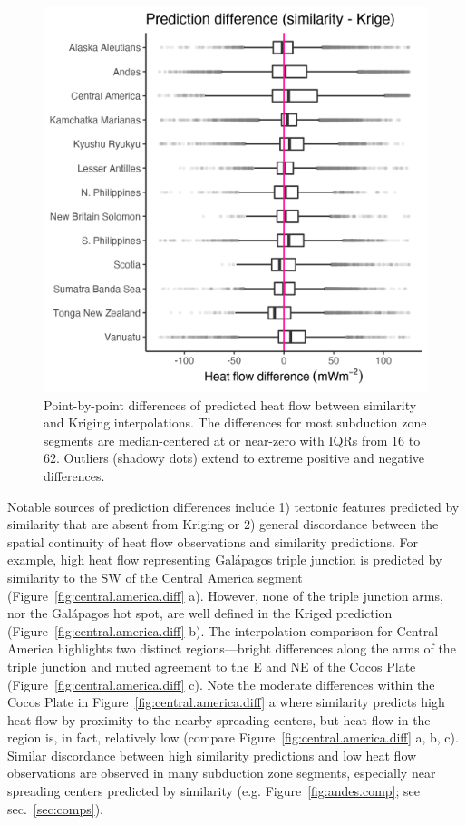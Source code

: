 \documentclass[draft,linenumbers]{agujournal2018}
\begin{document}
\begin{figure}[h]

{\centering \includegraphics[width=0.6\linewidth,]{../figs/summary/hf_diff_summary} 

}

\caption{Point-by-point differences of predicted heat flow between similarity and Kriging interpolations. The differences for most subduction zone segments are median-centered at or near-zero with IQRs from 16 to 62. Outliers (shadowy dots) extend to extreme positive and negative differences.}\label{fig:diff.summary.plot}
\end{figure}

Notable sources of prediction differences include 1) tectonic features
predicted by similarity that are absent from Kriging or 2) general
discordance between the spatial continuity of heat flow observations and
similarity predictions. For example, high heat flow representing
Galápagos triple junction is predicted by similarity to the SW of the
Central America segment (Figure~\ref{fig:central.america.diff} a).
However, none of the triple junction arms, nor the Galápagos hot spot,
are well defined in the Kriged prediction
(Figure~\ref{fig:central.america.diff} b). The interpolation comparison
for Central America highlights two distinct regions---bright differences
along the arms of the triple junction and muted agreement to the E and
NE of the Cocos Plate (Figure~\ref{fig:central.america.diff} c). Note
the moderate differences within the Cocos Plate in
Figure~\ref{fig:central.america.diff} a where similarity predicts high
heat flow by proximity to the nearby spreading centers, but heat flow in
the region is, in fact, relatively low (compare
Figure~\ref{fig:central.america.diff} a, b, c). Similar discordance
between high similarity predictions and low heat flow observations are
observed in many subduction zone segments, especially near spreading
centers predicted by similarity (e.g. Figure~\ref{fig:andes.comp}; see
sec.~\ref{sec:comps}).
\end{document}
